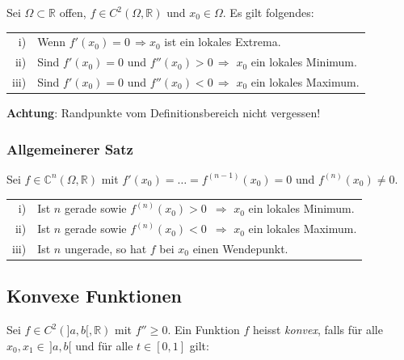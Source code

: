 \documentclass[a4paper, fontsize = 8pt, landscape]{scrartcl}
\newcommand{\R}[0]{\mathbb{R}}
\newcommand{\C}[0]{\mathbb{C}}
\begin{document}
\begin{multicols*}{3}
    Sei $\Omega \subset \R$ offen, $f \in C^2(\Omega, \R)$ und $x_0 \in \Omega$. Es gilt folgendes:

    \begin{center}
        \renewcommand{\arraystretch}{1.25}
        \begin{tabular}{r l} \toprule
            i)   & Wenn $f'(x_0) = 0 \, \Rightarrow x_0$ ist ein lokales Extrema.                  \\
            ii)  & Sind $f'(x_0) = 0$ und $f''(x_0) > 0 \, \Rightarrow$ $x_0$ ein lokales Minimum. \\
            iii) & Sind $f'(x_0) = 0$ und $f''(x_0) < 0 \, \Rightarrow$ $x_0$ ein lokales Maximum. \\
            \bottomrule
        \end{tabular}
    \end{center}

    \textbf{Achtung}: Randpunkte vom Definitionsbereich nicht vergessen!

    \subsubsection{Allgemeinerer Satz}

    Sei $f \in \C^n(\Omega, \R)$ mit $f'(x_0) = \dots = f^{(n-1)}(x_0) = 0$ und $f^{(n)}(x_0) \neq 0$.

    \begin{center}
        \renewcommand{\arraystretch}{1.25}
        \begin{tabular}{r l} \toprule
            i)   & Ist $n$ gerade sowie $f^{(n)}(x_0) > 0$ $\,\Rightarrow$ $x_0$ ein lokales Minimum. \\
            ii)  & Ist $n$ gerade sowie $f^{(n)}(x_0) < 0$ $\,\Rightarrow$ $x_0$ ein lokales Maximum. \\
            iii) & Ist $n$ ungerade, so hat $f$ bei $x_0$ einen Wendepunkt.                           \\
            \bottomrule
        \end{tabular}
    \end{center}


    \subsection{Konvexe Funktionen}

    Sei $f \in C^2(]a,b[, \R)$ mit $f'' \geq 0$. Ein Funktion $f$ heisst \emph{konvex}, falls für alle $x_0, x_1 \in \, ]a,b[$ und für alle $t \in [0,1]$ gilt:


\end{multicols*}
\end{document}
